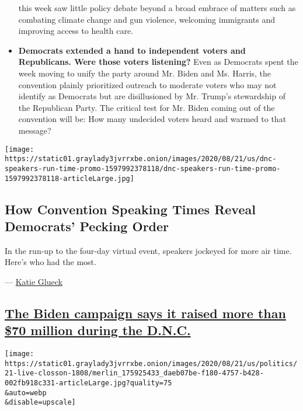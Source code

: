 \begin{itemize}
  this week saw little policy debate beyond a broad embrace of matters
  such as combating climate change and gun violence, welcoming
  immigrants and improving access to health care.
\item
  \textbf{Democrats extended a hand to independent voters and
  Republicans. Were those voters listening?} Even as Democrats spent the
  week moving to unify the party around Mr. Biden and Ms. Harris, the
  convention plainly prioritized outreach to moderate voters who may not
  identify as Democrats but are disillusioned by Mr. Trump's stewardship
  of the Republican Party. The critical test for Mr. Biden coming out of
  the convention will be: How many undecided voters heard and warmed to
  that message?
\end{itemize}

\href{https://www.nytimes3xbfgragh.onion/interactive/2020/08/21/us/politics/dnc-speakers-run-time.html}{}

\texttt{[image: https://static01.graylady3jvrrxbe.onion/images/2020/08/21/us/dnc-speakers-run-time-promo-1597992378118/dnc-speakers-run-time-promo-1597992378118-articleLarge.jpg]}

\hypertarget{how-convention-speaking-times-reveal-democrats-pecking-order}{%
\subsection{How Convention Speaking Times Reveal Democrats' Pecking
Order}\label{how-convention-speaking-times-reveal-democrats-pecking-order}}

In the run-up to the four-day virtual event, speakers jockeyed for more
air time. Here's who had the most.

--- \href{https://www.nytimes3xbfgragh.onion/by/katie-glueck}{Katie
Glueck}

\hypertarget{the-biden-campaign-says-it-raised-more-than-70-million-during-the-dnc}{%
\subsection{\texorpdfstring{\protect\hyperlink{the-biden-campaign-says-it-raised-more-than-70-million-during-the-dnc}{The
Biden campaign says it raised more than \$70 million during the
D.N.C.}}{The Biden campaign says it raised more than \$70 million during the D.N.C.}}\label{the-biden-campaign-says-it-raised-more-than-70-million-during-the-dnc}}

\texttt{[image: https://static01.graylady3jvrrxbe.onion/images/2020/08/21/us/politics/21-live-closson-1808/merlin\_175925433\_daeb07be-f180-4757-b428-002fb918c331-articleLarge.jpg?quality=75\\\&auto=webp\\\&disable=upscale]}

